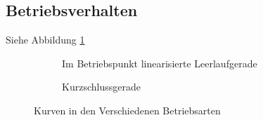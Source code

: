 
    \subsection{Betriebsverhalten}
    	Siehe Abbildung \ref{fig:betriebsverhalten}
    	\begin{figure}[h!]
	    	\centering
	    	\begin{subfigure}[t]{0.45\textwidth}
	    		\centering
	    		\caption{Im Betriebspunkt linearisierte Leerlaufgerade}
	    	\end{subfigure}
	    	\begin{subfigure}[t]{0.45\textwidth}
	    		\centering
	    		\caption{Kurzschlussgerade}
	        \end{subfigure}
	        \caption{Kurven in den Verschiedenen Betriebsarten}
	        \label{fig:betriebsverhalten}
    	\end{figure}
    	
